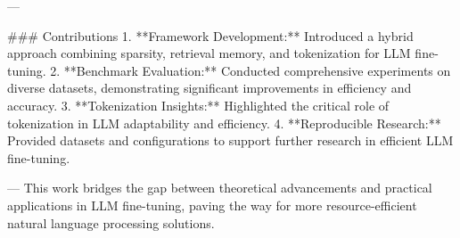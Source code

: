 ---

### Contributions  
1. **Framework Development:** Introduced a hybrid approach combining sparsity, retrieval memory, and tokenization for LLM fine-tuning.  
2. **Benchmark Evaluation:** Conducted comprehensive experiments on diverse datasets, demonstrating significant improvements in efficiency and accuracy.  
3. **Tokenization Insights:** Highlighted the critical role of tokenization in LLM adaptability and efficiency.  
4. **Reproducible Research:** Provided datasets and configurations to support further research in efficient LLM fine-tuning.  

---  
This work bridges the gap between theoretical advancements and practical applications in LLM fine-tuning, paving the way for more resource-efficient natural language processing solutions.